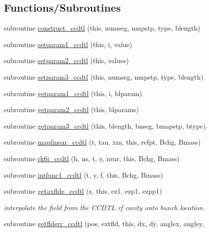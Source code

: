 \subsection*{Functions/\+Subroutines}
\begin{DoxyCompactItemize}
\item 
subroutine \mbox{\hyperlink{namespaceccdtlclass_aaa94d8179c6d59c2d3e81b64e8237962}{construct\+\_\+ccdtl}} (this, numseg, nmpstp, type, blength)
\item 
subroutine \mbox{\hyperlink{namespaceccdtlclass_adedaabef796136ab3b22dcc923243cfd}{setparam1\+\_\+ccdtl}} (this, i, value)
\item 
subroutine \mbox{\hyperlink{namespaceccdtlclass_aa32b5665906eac3911db6712a5710f97}{setparam2\+\_\+ccdtl}} (this, values)
\item 
subroutine \mbox{\hyperlink{namespaceccdtlclass_a3632b0f42925964cedb7778792da563f}{setparam3\+\_\+ccdtl}} (this, numseg, nmpstp, type, blength)
\item 
subroutine \mbox{\hyperlink{namespaceccdtlclass_a027b988ab66d8b89dabf46f5e45d82f5}{getparam1\+\_\+ccdtl}} (this, i, blparam)
\item 
subroutine \mbox{\hyperlink{namespaceccdtlclass_a8455f87d9ac20671adf737902c8b90d8}{getparam2\+\_\+ccdtl}} (this, blparams)
\item 
subroutine \mbox{\hyperlink{namespaceccdtlclass_a529631343d4306c6c486d72e2a6696a3}{getparam3\+\_\+ccdtl}} (this, blength, bnseg, bmapstp, btype)
\item 
subroutine \mbox{\hyperlink{namespaceccdtlclass_a520796b320588e1f31ce8587301b571b}{maplinear\+\_\+ccdtl}} (t, tau, xm, this, refpt, Bchg, Bmass)
\item 
subroutine \mbox{\hyperlink{namespaceccdtlclass_aca1c6ac6cdbd554820ab2c213a987647}{rk6i\+\_\+ccdtl}} (h, ns, t, y, nvar, this, Bchg, Bmass)
\item 
subroutine \mbox{\hyperlink{namespaceccdtlclass_afad7c4471295ba39993a4a180d6a4d54}{intfunc1\+\_\+ccdtl}} (t, y, f, this, Bchg, Bmass)
\item 
subroutine \mbox{\hyperlink{namespaceccdtlclass_adb7b1c30d3fcb087a5064911ccd4fd1d}{getaxflde\+\_\+ccdtl}} (z, this, ez1, ezp1, ezpp1)
\begin{DoxyCompactList}\small\item\em interpolate the field from the C\+C\+D\+TL rf cavity onto bunch location. \end{DoxyCompactList}\item 
subroutine \mbox{\hyperlink{namespaceccdtlclass_ab81d1b262943e405eebe3bfef401bb97}{getflderr\+\_\+ccdtl}} (pos, extfld, this, dx, dy, anglex, angley,

\end{DoxyCompactItemize}
